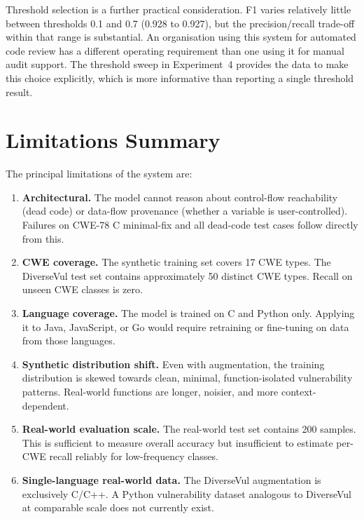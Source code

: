 Threshold selection is a further practical consideration.
F1 varies relatively little between thresholds 0.1 and 0.7 (0.928 to 0.927), but the
precision/recall trade-off within that range is substantial.
An organisation using this system for automated code review has a different operating
requirement than one using it for manual audit support.
The threshold sweep in Experiment~4 provides the data to make this choice explicitly,
which is more informative than reporting a single threshold result.

\section{Limitations Summary}

The principal limitations of the system are:

\begin{enumerate}
  \item \textbf{Architectural.}
        The model cannot reason about control-flow reachability (dead code) or data-flow
        provenance (whether a variable is user-controlled).
        Failures on CWE-78 C minimal-fix and all dead-code test cases follow directly from this.

  \item \textbf{CWE coverage.}
        The synthetic training set covers 17 CWE types.
        The DiverseVul test set contains approximately 50 distinct CWE types.
        Recall on unseen CWE classes is zero.

  \item \textbf{Language coverage.}
        The model is trained on C and Python only.
        Applying it to Java, JavaScript, or Go would require retraining or fine-tuning
        on data from those languages.

  \item \textbf{Synthetic distribution shift.}
        Even with augmentation, the training distribution is skewed towards clean,
        minimal, function-isolated vulnerability patterns.
        Real-world functions are longer, noisier, and more context-dependent.

  \item \textbf{Real-world evaluation scale.}
        The real-world test set contains 200 samples.
        This is sufficient to measure overall accuracy but insufficient to estimate
        per-CWE recall reliably for low-frequency classes.

  \item \textbf{Single-language real-world data.}
        The DiverseVul augmentation is exclusively C/C++.
        A Python vulnerability dataset analogous to DiverseVul at comparable scale does
        not currently exist.
\end{enumerate}

